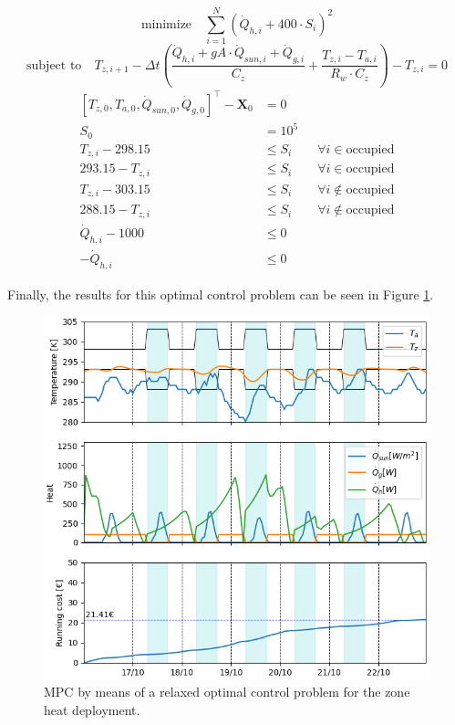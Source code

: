 \begin{equation}
{\text{minimize}} \hspace{1em} \sum_{i=1}^{N} \left(\dot{Q}_{h,i} + 400\cdot S_i\right)^2
\label{eq:mpclag1}
\end{equation}
\begin{equation}
\text{subject to}  \hspace{1em} T_{z,i+1} - \Delta t \left( \frac{\dot{Q}_{h,i} + gA \cdot \dot{Q}_{sun, i} + \dot{Q}_{g,i}}{C_z} + \frac{T_{z,i}-T_{a,i}}{R_w \cdot C_z} \right) - T_{z,i} =0
\end{equation}
\vspace{-0.5em}
\begin{align}
\left[T_{z,0}, T_{a,0}, \dot{Q}_{sun,0}, \dot{Q}_{g,0}\right]^{\top}  - \boldsymbol{X}_0 &=  0 \\[0.5em]
S_0 &= 10^5 \\[0.5em]
T_{z,i} - 298.15 &\leq S_i \hspace{2em} \forall i \in \text{occupied}\\[0.5em]
293.15 - T_{z,i} &\leq S_i \hspace{2em} \forall i \in \text{occupied}\\[0.5em]
T_{z,i} - 303.15 &\leq S_i \hspace{2em} \forall i \notin \text{occupied}\\[0.5em]
288.15 - T_{z,i} &\leq S_i \hspace{2em} \forall i \notin \text{occupied}\\[0.5em]
\dot{Q}_{h,i} - 1000 &\leq 0\\[0.5em]
-\dot{Q}_{h,i} &\leq 0
\label{eq:mpclag2}
\end{align}

Finally, the results for this optimal control problem can be seen in Figure \ref{fig:mpc_lagrangian}.

\begin{figure}[H]
\centering
\includegraphics[scale=0.8]{images/mpc_lagrangian.png}
\caption{MPC by means of a relaxed optimal control problem for the zone heat deployment.}
\label{fig:mpc_lagrangian}
\end{figure}

